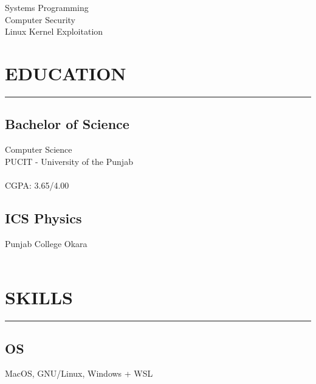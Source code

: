 \documentclass[]{jobCV}
\begin{document}
%
%

\begin{minipage}[t]{0.33\textwidth}

    \begin{large}
        \\
    \end{large}

    \vspace{4pt}
    \noindent {}\\
    Systems Programming\\
    Computer Security\\
    Linux Kernel Exploitation



    \section{EDUCATION}
    \noindent\rule{5cm}{0.4pt}

    \subsection{Bachelor of Science}
    \noindent Computer Science\\
    PUCIT - University of the Punjab\\
    \\
    CGPA: 3.65/4.00

    \vspace{8pt}
    \subsection{ICS Physics}
    \noindent Punjab College Okara\\
    \\


    \section{SKILLS}
    \noindent\rule{5cm}{0.4pt}

    \subsection{OS}
    \noindent MacOS, GNU/Linux, Windows + WSL


\end{minipage}
\end{document}
